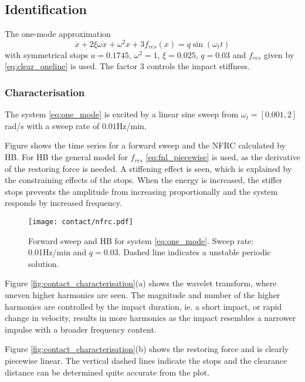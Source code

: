 \subsection{Identification}
\label{sec:contact_identification}

The one-mode approximation
\begin{equation}
  \label{eq:one_mode}
  \ddot x + 2 \xi \omega \dot x + \omega^2x + 3f_{res}(x) = q\sin(\omega_t t)
\end{equation}
with symmetrical stops $a= 0.1745$, $\omega^2 = 1$, $\xi=0.025$, $q = 0.03$ and
$f_{res}$ given by \eqref{eq:clear_oneline} is used. The factor 3 controls the
impact stiffness.


\subsubsection{Characterisation}

The system \eqref{eq:one_mode} is excited by a linear sine sweep from
$\omega_t=[0.001,2]$rad/s with a sweep rate of $0.01$Hz/min.

Figure shows the time series for a forward sweep and the NFRC calculated by HB.
For HB the general model for $f_{res}$ \eqref{eq:fnl_piecewise} is used, as the
derivative of the restoring force is needed.
A stiffening effect is seen, which is explained by the constraining effects of the
stops. When the energy is increased, the stiffer stops prevents the amplitude
from increasing proportionally and the system responds by increased
frequency.

\begin{figure}
  \centering
  \texttt{[image: contact/nfrc.pdf]}
  \caption{Forward sweep and HB for system \eqref{eq:one_mode}. Sweep rate:
    0.01Hz/min and $q=0.03$. Dashed line indicates a unstable periodic solution.}
  \label{fig:contact_nfrc}
\end{figure}


Figure \ref{fig:contact_characterisation}(a) shows the wavelet transform, where
uneven higher harmonics are seen. The magnitude and number of the higher
harmonics are controlled by the impact duration, ie. a short impact, or rapid
change in velocity, results in more harmonics as the impact resembles a narrower
impulse with a broader frequency content.

Figure \ref{fig:contact_characterisation}(b) shows the restoring force and is
clearly piecewise linear. The vertical dashed lines indicate the stops and the
clearance distance can be determined quite accurate from the plot.

